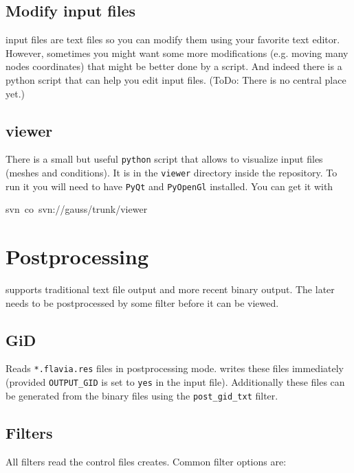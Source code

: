 \subsection{Modify \ccarat{} input files}

\ccarat{} input files are text files so you can modify them using
your favorite text editor. However, sometimes you might want some
more modifications (e.g. moving many nodes coordinates) that might
be better done by a script. And indeed there is a python script that
can help you edit input files. (ToDo: There is no central place yet.)


\subsection{viewer}

There is a small but useful \texttt{python} script that allows to
visualize \ccarat{} input files (meshes and conditions). It is in
the \texttt{viewer} directory inside the repository. To run it you
will need to have \texttt{PyQt} and \texttt{PyOpenGl} installed. You
can get it with

\begin{lyxcode}
svn~co~svn://gauss/trunk/viewer
\end{lyxcode}

\section{Postprocessing}

\ccarat{} supports traditional text file output and more recent binary
output. The later needs to be postprocessed by some filter before
it can be viewed.


\subsection{GiD}

Reads \texttt{{*}.flavia.res} files in postprocessing mode. \ccarat{}
writes these files immediately (provided \texttt{OUTPUT\_GID} is set
to \texttt{yes} in the input file). Additionally these files can be
generated from the binary files using the \texttt{post\_gid\_txt}
filter.


\subsection{Filters}

All filters read the control files \ccarat{} creates. Common filter
options are:

